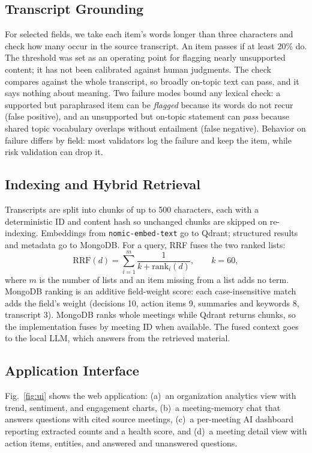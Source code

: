 \documentclass[conference]{IEEEtran}
\begin{document}
\subsection{Transcript Grounding}
\label{sec:design:grounding}
For selected fields, we take each item's words longer than three characters and check how many occur in the source transcript. An item passes if at least 20\% do. The threshold was set as an operating point for flagging nearly unsupported content; it has not been calibrated against human judgments. The check compares against the whole transcript, so broadly on-topic text can pass, and it says nothing about meaning. Two failure modes bound any lexical check: a supported but paraphrased item can be \emph{flagged} because its words do not recur (false positive), and an unsupported but on-topic statement can \emph{pass} because shared topic vocabulary overlaps without entailment (false negative). Behavior on failure differs by field: most validators log the failure and keep the item, while risk validation can drop it.

\subsection{Indexing and Hybrid Retrieval}
Transcripts are split into chunks of up to 500 characters, each with a deterministic ID and content hash so unchanged chunks are skipped on re-indexing. Embeddings from \texttt{nomic-embed-text} go to Qdrant; structured results and metadata go to MongoDB. For a query, RRF fuses the two ranked lists:
\begin{equation}
\mathrm{RRF}(d)=\sum_{i=1}^{m}\frac{1}{k+\mathrm{rank}_i(d)},\qquad k=60,
\label{eq:rrf}
\end{equation}
where $m$ is the number of lists and an item missing from a list adds no term. MongoDB ranking is an additive field-weight score: each case-insensitive match adds the field's weight (decisions 10, action items 9, summaries and keywords 8, transcript 3). MongoDB ranks whole meetings while Qdrant returns chunks, so the implementation fuses by meeting ID when available. The fused context goes to the local LLM, which answers from the retrieved material.

\subsection{Application Interface}
Fig.~\ref{fig:ui} shows the web application: (a)~an organization analytics view with trend, sentiment, and engagement charts, (b)~a meeting-memory chat that answers questions with cited source meetings, (c)~a per-meeting AI dashboard reporting extracted counts and a health score, and (d)~a meeting detail view with action items, entities, and answered and unanswered questions.
\end{document}
